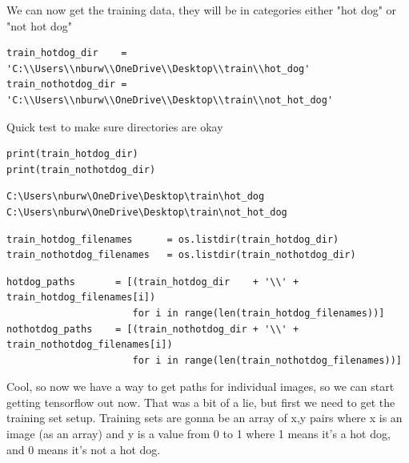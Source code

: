 \documentclass[
]{article}
\begin{document}
We can now get the training data, they will be in categories either "hot
dog" or "not hot dog"

\begin{Verbatim}[frame=single]
train_hotdog_dir    = 'C:\\Users\\nburw\\OneDrive\\Desktop\\train\\hot_dog'
train_nothotdog_dir = 'C:\\Users\\nburw\\OneDrive\\Desktop\\train\\not_hot_dog'
\end{Verbatim}

Quick test to make sure directories are okay

\begin{Verbatim}[frame=single]
print(train_hotdog_dir)
print(train_nothotdog_dir)
\end{Verbatim}

\begin{verbatim}
C:\Users\nburw\OneDrive\Desktop\train\hot_dog
C:\Users\nburw\OneDrive\Desktop\train\not_hot_dog
\end{verbatim}

\begin{Verbatim}[frame=single]
train_hotdog_filenames      = os.listdir(train_hotdog_dir)
train_nothotdog_filenames   = os.listdir(train_nothotdog_dir)
\end{Verbatim}

\newpage
\begin{Verbatim}[frame=single]
hotdog_paths       = [(train_hotdog_dir    + '\\' + train_hotdog_filenames[i])    
                      for i in range(len(train_hotdog_filenames))]
nothotdog_paths    = [(train_nothotdog_dir + '\\' + train_nothotdog_filenames[i]) 
                      for i in range(len(train_nothotdog_filenames))]
\end{Verbatim}

Cool, so now we have a way to get paths for individual images, so we can
start getting tensorflow out now. That was a bit of a lie, but first we
need to get the training set setup. Training sets are gonna be an array
of x,y pairs where x is an image (as an array) and y is a value from 0
to 1 where 1 means it's a hot dog, and 0 means it's not a hot dog.
\end{document}
